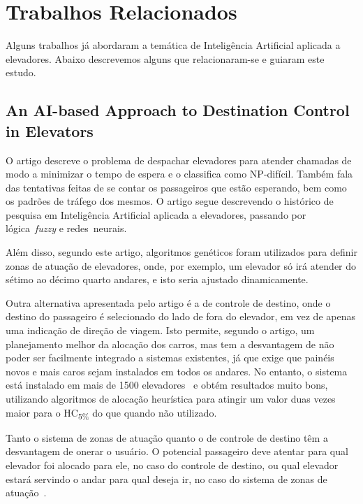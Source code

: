 \chapter{\label{chap:related}Trabalhos Relacionados}

Alguns trabalhos já abordaram a temática de Inteligência Artificial aplicada a
elevadores. Abaixo descrevemos alguns que relacionaram-se e guiaram este estudo.

\section{\label{section:koehler}An AI-based Approach to Destination Control in
Elevators~\cite{KOEHLEROTTIGER02}}

O artigo descreve o problema de despachar elevadores para atender chamadas de
modo a minimizar o tempo de espera e o classifica como NP-difícil. Também fala
das tentativas feitas de se contar os passageiros que estão esperando, bem como
os padrões de tráfego dos mesmos. O artigo segue descrevendo o histórico de
pesquisa em Inteligência Artificial aplicada a elevadores, passando por
lógica~\textit{fuzzy} e redes~neurais.

Além disso, segundo este artigo, algoritmos genéticos foram utilizados para
definir zonas de atuação de elevadores, onde, por exemplo, um elevador só irá
atender do sétimo ao décimo quarto andares, e isto seria ajustado dinamicamente.

Outra alternativa apresentada pelo artigo é a de controle de destino, onde o
destino do passageiro é selecionado do lado de fora do elevador, em vez de
apenas uma indicação de direção de viagem. Isto permite, segundo o artigo, um
planejamento melhor da alocação dos carros, mas tem a desvantagem de não poder
ser facilmente integrado a sistemas existentes, já que exige que painéis novos e
mais caros sejam instalados em todos os andares. No entanto, o sistema  está
instalado em mais de 1500 elevadores~\cite{KOEHLEROTTIGER02} e obtém resultados
muito bons, utilizando algoritmos de alocação heurística para atingir um valor
duas vezes maior para o HC\textsubscript{5\%} do que quando não utilizado.

Tanto o sistema de zonas de atuação quanto o de controle de destino têm a
desvantagem de onerar o usuário. O potencial passageiro deve atentar para qual
elevador foi alocado para ele, no caso do controle de destino, ou qual elevador
estará servindo o andar para qual deseja ir, no caso do sistema de zonas de
atuação~\cite{KOEHLEROTTIGER02}.

